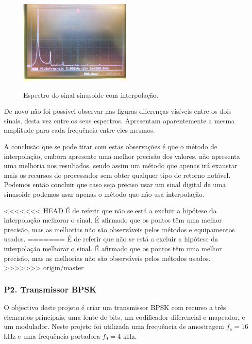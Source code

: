 \documentclass[11pt]{article}
\begin{document}
\begin{figure}[H]
	\centering
	\includegraphics[width=0.5\textwidth]{./P1-8_espect_c_interp}~\\
	\caption{Espectro do sinal sinusoide com interpolação.}
	\label{fig:espect_c_interp}
\end{figure}

De novo não foi possível observar nas figuras diferenças visíveis entre os dois sinais, desta vez entre os seus espectros. Apresentam aparentemente a mesma amplitude para cada frequência entre eles mesmos.

A conclusão que se pode tirar com estas observações é que o método de interpolação, embora apresente uma melhor precisão dos valores, não apresenta uma melhoria nos resultados, sendo assim um método que apenas irá exaustar mais os recursos do processador sem obter qualquer tipo de retorno notável. Podemos então concluir que caso seja preciso usar um sinal digital de uma sinusoide podemos usar apenas o método que não usa interpolação.

<<<<<<< HEAD
É de referir que não se está a excluir a hipótese da interpolação melhorar o sinal. É afirmado que os pontos têm uma melhor precisão, mas as melhorias não são observáveis pelos métodos e equipamentos usados.
=======
É de referir que não se está a excluir a hipótese da interpolação melhorar o sinal. É afirmado que os pontos têm uma melhor precisão, mas as melhorias não são observáveis pelos métodos usados.
>>>>>>> origin/master

\subsubsection{P2. Transmissor BPSK}

O objectivo deste projeto é criar um transmissor BPSK com recurso a três elementos principais, uma fonte de bits, um codificador diferencial e mapeador, e um modulador.
Neste projeto foi utilizada uma frequência de amostragem $f_s=16$ kHz e uma frequência portadora $f_0=4$ kHz.
\end{document}
